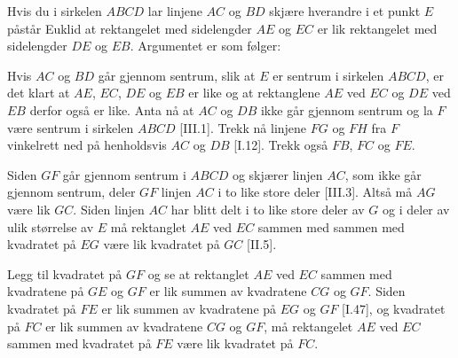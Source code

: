 \documentclass[norsk,twoside,utf8]{article}
\begin{document}
\begin{center}
\end{center}

\noindent
Hvis du i sirkelen $ABCD$ lar linjene $AC$ og $BD$ skjære hverandre i et punkt $E$ påstår Euklid at rektangelet med sidelengder $AE$ og $EC$ er lik rektangelet med sidelengder $DE$ og $EB$. Argumentet er som følger: \vspace{1em}

\noindent
Hvis $AC$ og $BD$ går gjennom sentrum, slik at $E$ er sentrum i sirkelen $ABCD$, er det klart at $AE$, $EC$, $DE$ og $EB$ er like og at rektanglene $AE$ ved $EC$ og $DE$ ved $EB$ derfor også er like. Anta nå at $AC$ og $DB$ ikke går gjennom sentrum og la $F$ være sentrum i sirkelen $ABCD$ [III.1]. Trekk nå linjene $FG$ og $FH$ fra $F$ vinkelrett ned på henholdsvis $AC$ og $DB$ [I.12]. Trekk også $FB$, $FC$ og $FE$.

Siden $GF$ går gjennom sentrum i $ABCD$ og skjærer linjen $AC$, som ikke går gjennom sentrum, deler $GF$ linjen $AC$ i to like store deler [III.3]. Altså må $AG$ være lik $GC$. Siden linjen $AC$ har blitt delt i to like store deler av $G$ og i deler av ulik størrelse av $E$ må rektanglet $AE$ ved $EC$ sammen med sammen med kvadratet på $EG$ være lik kvadratet på $GC$ [II.5].

Legg til kvadratet på $GF$ og se at rektanglet $AE$ ved $EC$ sammen med kvadratene på $GE$ og $GF$ er lik summen av kvadratene $CG$ og $GF$. Siden kvadratet på $FE$ er lik summen av kvadratene på $EG$ og $GF$ [I.47], og kvadratet på $FC$ er lik summen av kvadratene $CG$ og $GF$, må rektangelet $AE$ ved $EC$ sammen med kvadratet på $FE$ være lik kvadratet på $FC$.
\end{document}
